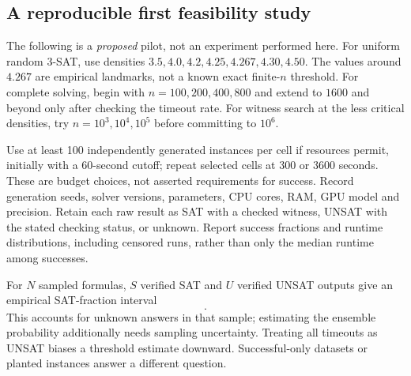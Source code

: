 \subsection{A reproducible first feasibility study}
The following is a \emph{proposed} pilot, not an experiment performed here.
For uniform random $3$-SAT, use densities $3.5,4.0,4.2,4.25,4.267,4.30,4.50$.
The values around $4.267$ are empirical landmarks, not a known exact
finite-$n$ threshold. For complete solving, begin with
$n=100,200,400,800$ and extend to $1600$ and beyond only after checking the
timeout rate. For witness search at the less critical densities, try
$n=10^3,10^4,10^5$ before committing to $10^6$.

Use at least 100 independently generated instances per cell if resources
permit, initially with a 60-second cutoff; repeat selected cells at 300 or
3600 seconds. These are budget choices, not asserted requirements for
success. Record generation seeds, solver versions, parameters, CPU cores,
RAM, GPU model and precision. Retain each raw result as SAT with a checked
witness, UNSAT with the stated checking status, or unknown. Report success
fractions and runtime distributions, including censored runs, rather than
only the median runtime among successes.

For $N$ sampled formulas, $S$ verified SAT and $U$ verified UNSAT outputs give
an empirical SAT-fraction interval
\begin{equation}
 [S/N,\;1-U/N].
 \label{eq:censor}
\end{equation}
This accounts for unknown answers in that sample; estimating the ensemble
probability additionally needs sampling uncertainty. Treating all timeouts
as UNSAT biases a threshold estimate downward. Successful-only datasets or
planted instances answer a different question.
